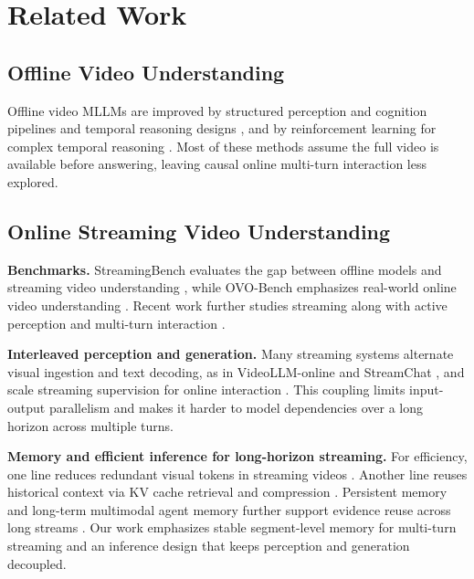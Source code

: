 \documentclass{article}
\begin{document}
\section{Related Work}

\subsection{Offline Video Understanding}
Offline video MLLMs are improved by structured perception and cognition pipelines and temporal reasoning designs \cite{DBLP:journals/corr/abs-2501-03230,DBLP:journals/corr/abs-2511-04570,DBLP:journals/corr/abs-2508-04416}, and by reinforcement learning for complex temporal reasoning \cite{DBLP:journals/corr/abs-2503-21776,DBLP:journals/corr/abs-2507-07966}. Most of these methods assume the full video is available before answering, leaving causal online multi-turn interaction less explored.

\subsection{Online Streaming Video Understanding}

\noindent\textbf{Benchmarks.}
StreamingBench evaluates the gap between offline models and streaming video understanding \cite{lin2024streamingbenchassessinggapmllms}, while OVO-Bench emphasizes real-world online video understanding \cite{DBLP:conf/cvpr/NiuLMGZHDDD0ZZC25}. Recent work further studies streaming along with active perception and multi-turn interaction \cite{Yang2025ViSPeak,lee2025streamgazegazeguidedtemporalreasoning,DBLP:journals/corr/abs-2510-14560,DBLP:conf/iclr/YangHDXQW0DX25,DBLP:journals/corr/abs-2505-02064}.

\noindent\textbf{Interleaved perception and generation.}
Many streaming systems alternate visual ingestion and text decoding, as in VideoLLM-online \cite{DBLP:conf/cvpr/ChenLWLSGLGMS24} and StreamChat \cite{DBLP:journals/corr/abs-2412-08646}, and scale streaming supervision for online interaction \cite{DBLP:conf/cvpr/ChenZLLMS25,DBLP:journals/corr/abs-2510-09608}. This coupling limits input-output parallelism and makes it harder to model dependencies over a long horizon across multiple turns.

\noindent\textbf{Memory and efficient inference for long-horizon streaming.}
For efficiency, one line reduces redundant visual tokens in streaming videos \cite{DBLP:journals/corr/abs-2504-17343,DBLP:conf/cvpr/ZhouABYMXNS24,DBLP:journals/corr/abs-2510-18269,DBLP:conf/iclr/XiongYYZ0ZL25}. Another line reuses historical context via KV cache retrieval and compression \cite{kim2025vrexrealtimestreamingvideo,DBLP:journals/corr/abs-2511-07278,DBLP:conf/iclr/DiYZLZCLHSJ25,DBLP:journals/corr/abs-2505-15269,DBLP:journals/corr/abs-2505-13140,DBLP:journals/corr/abs-2506-23825}. Persistent memory and long-term multimodal agent memory further support evidence reuse across long streams \cite{DBLP:journals/corr/abs-2509-24871,DBLP:journals/corr/abs-2508-09736,DBLP:journals/corr/abs-2508-01875}. Our work emphasizes stable segment-level memory for multi-turn streaming and an inference design that keeps perception and generation decoupled.
\end{document}
